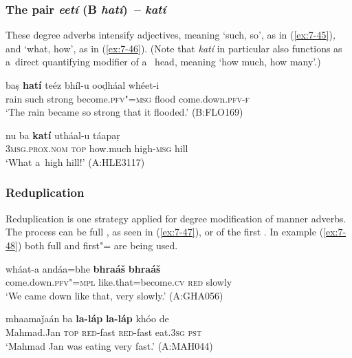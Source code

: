 \subsubsection*{The  pair \textit{eetí} (B \textit{hatí})~-- \textit{katí}}%

These  degree adverbs intensify adjectives, meaning `such, so', as in (\ref{ex:7-45})\textit{,} and `what, how', as in (\ref{ex:7-46}). (Note that \textit{katí} in particular also functions as a~direct quantifying modifier of a~ head, meaning `how much, how many'.)

\begin{exe}
\ex
\label{ex:7-45}
\gll baṣ \textbf{hatí} teéz bhíl-u ooḍháal whéet-i \\
rain such strong become.\textsc{pfv"=msg} flood come.down.\textsc{pfv-f} \\
\glt `The rain became so strong that it flooded.' (B:FLO169)
\end{exe}
\begin{exe}
\ex
\label{ex:7-46}
\gll nu ba \textbf{katí} utháal-u táapaṛ \\
\textsc{3msg.prox.nom} \textsc{top} how.much high-\textsc{msg}  hill  \\
\glt `What a~high hill!' (A:HLE3117)
\end{exe}

\subsubsection*{Reduplication}

Reduplication is one strategy applied for degree modification of manner adverbs. The process can be
full , as seen in (\ref{ex:7-47}), or  of the first . In example
(\ref{ex:7-48}) both full and first"=  are being used.

\begin{exe}
\ex
\label{ex:7-47}
\gll wháat-a andáa=bhe \textbf{bhraáš} \textbf{bhraáš} \\
come.down.\textsc{pfv"=mpl} like.that=become.\textsc{cv} \textsc{red} slowly  \\
\glt `We came down like that, very slowly.' (A:GHA056)
\end{exe}
\begin{exe}
\ex
\label{ex:7-48}
\gll mhaamaǰaán ba \textbf{la-láp} \textbf{la-láp} khóo de \\
Mahmad.Jan \textsc{top} \textsc{red}-fast \textsc{red}-fast eat.\textsc{3sg} \textsc{pst } \\
\glt `Mahmad Jan was eating very fast.' (A:MAH044)
\end{exe}

